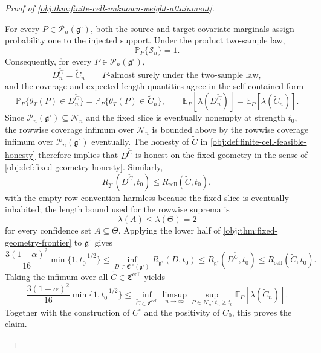 \begin{proof}[Proof of \cref{obj:thm:finite-cell-unknown-weight-attainment}]
\begin{enumerate}
For every \(P\in\mathcal P_n(\mathfrak g^\circ)\), both the source and target covariate marginals assign probability one to the injected support.  Under the product two-sample law,
\[
\mathbb P_P\{\mathcal S_n\}=1.
\]
Consequently, for every \(P\in\mathcal P_n(\mathfrak g^\circ)\),
\[
D^{\widetilde C}_n=\widetilde C_n
\qquad
P\text{-almost surely under the two-sample law},
\]
and the coverage and expected-length quantities agree in the self-contained form
\[
\mathbb P_P\{\theta_T(P)\in D^{\widetilde C}_n\}
=
\mathbb P_P\{\theta_T(P)\in \widetilde C_n\},
\qquad
\mathbb E_P[\lambda(D^{\widetilde C}_n)]
=
\mathbb E_P[\lambda(\widetilde C_n)].
\]
Since \(\mathcal P_n(\mathfrak g^\circ)\subseteq\mathcal N_n\) and the fixed slice is eventually nonempty at strength \(t_0\), the rowwise coverage infimum over \(\mathcal N_n\) is bounded above by the rowwise coverage infimum over \(\mathcal P_n(\mathfrak g^\circ)\) eventually.  The honesty of \(\widetilde C\) in \cref{obj:def:finite-cell-feasible-honesty} therefore implies that \(D^{\widetilde C}\) is honest on the fixed geometry in the sense of \cref{obj:def:fixed-geometry-honesty}.  Similarly,
\[
R_{\mathfrak g^\circ}(D^{\widetilde C},t_0)
\le
R_{\mathrm{cell}}(\widetilde C,t_0),
\]
with the empty-row convention harmless because the fixed slice is eventually inhabited; the length bound used for the rowwise suprema is
\[
\lambda(A)\le\lambda(\Theta)=2
\]
for every confidence set \(A\subseteq\Theta\).
Applying the lower half of \cref{obj:thm:fixed-geometry-frontier} to \(\mathfrak g^\circ\) gives
\[
\frac{3(1-\alpha)^2}{16}\min\{1,t_0^{-1/2}\}
\le
\inf_{D\in\mathfrak C^{\mathrm{or}}(\mathfrak g^\circ)}
R_{\mathfrak g^\circ}(D,t_0)
\le
R_{\mathfrak g^\circ}(D^{\widetilde C},t_0)
\le
R_{\mathrm{cell}}(\widetilde C,t_0).
\]
Taking the infimum over all
\(\widetilde C\in\mathfrak C^{\mathrm{cell}}\) yields
\[
\frac{3(1-\alpha)^2}{16}\min\{1,t_0^{-1/2}\}
\le
\inf_{\widetilde C\in\mathfrak C^{\mathrm{cell}}}
\limsup_{n\to\infty}
\sup_{P\in\mathcal N_n:\,t_n\ge t_0}
\mathbb E_P[\lambda(\widetilde C_n)].
\]
Together with the construction of \(C^\circ\) and the positivity of \(C_0\), this proves the claim.
\end{enumerate}
\end{proof}

